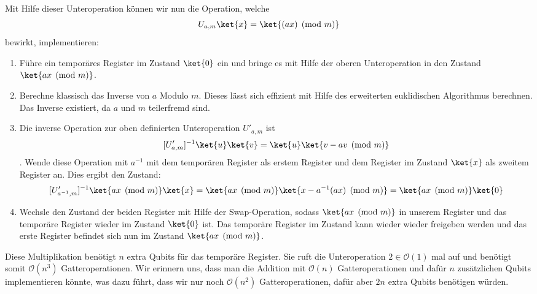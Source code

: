 Mit Hilfe dieser Unteroperation können wir nun die Operation, welche $$U_{a, m}\ket{x} = \ket{(ax) \pmod{m}}$$ bewirkt, implementieren:
\begin{enumerate}
    \item Führe ein temporäres Register im Zustand $\ket{0}$ ein und bringe es mit Hilfe der oberen Unteroperation in den Zustand $\ket{ax \pmod{m}}$.
    \item Berechne klassisch das Inverse von $a$ Modulo $m$. Dieses lässt sich effizient mit Hilfe des erweiterten euklidischen Algorithmus berechnen. Das Inverse existiert, da $a$ und $m$ teilerfremd sind.
    \item Die inverse Operation zur oben definierten Unteroperation $U'_{a, m}$ ist $$[U'_{a, m}]^{-1}\ket{u}\ket{v} = \ket{u}\ket{v - av \pmod{m}}$$. Wende diese Operation mit $a^{-1}$ mit dem temporären Register als erstem Register und dem Register im Zustand $\ket{x}$ als zweitem Register an. Dies ergibt den Zustand: $$[U'_{a^{-1}, m}]^{-1}\ket{ax \pmod{m}}\ket{x} = \ket{ax \pmod{m}}\ket{x - a^{-1}(ax) \pmod{m}} = \ket{ax \pmod{m}}\ket{0}$$
    \item Wechsle den Zustand der beiden Register mit Hilfe der Swap-Operation, sodass $\ket{ax \pmod{m}}$ in unserem Register und das temporäre Register wieder im Zustand $\ket{0}$ ist. Das temporäre Register im Zustand kann wieder wieder freigeben werden und das erste Register befindet sich nun im Zustand $\ket{ax \pmod{m}}$.
\end{enumerate}
Diese Multiplikation benötigt $n$ extra Qubits für das temporäre Register. Sie ruft die Unteroperation $2 \in \mathcal O(1)$ mal auf und benötigt somit $\mathcal O(n^3)$ Gatteroperationen. Wir erinnern uns, dass man die Addition mit $\mathcal O(n)$ Gatteroperationen und dafür $n$ zusätzlichen Qubits implementieren könnte, was dazu führt, dass wir nur noch $\mathcal O(n^2)$ Gatteroperationen, dafür aber $2n$ extra Qubits benötigen würden.
